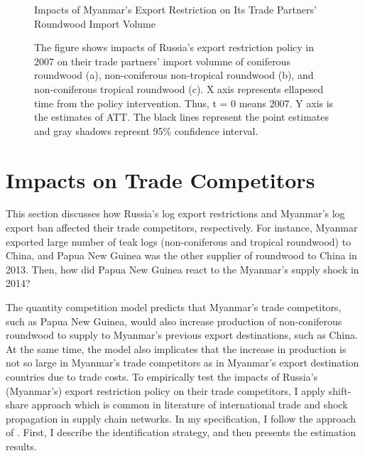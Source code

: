 \documentclass[a4paper,12pt]{article}
\begin{document}
\begin{figure}[H] 
    \centering
    \caption{Impacts of Myanmar's Export Restriction on Its Trade Partners' Roundwood Import Volume}
    \caption*{\small{The figure shows impacts of Russia's export restriction policy in 2007 on their trade partners' import volumne of coniferous roundwood (a), non-coniferous non-tropical roundwood (b), and non-coniferous tropical roundwood (c). X axis represents ellapesed time from the policy intervention. Thus, t = 0 means 2007. Y axis is the estimates of ATT. The black lines represent the point estimates and gray shadows represnt 95\% confidence interval.}}
    \label{fig:cf_imp_Myanmar}
\end{figure}

\section{Impacts on Trade Competitors}
This section discusses how Russia's log export restrictions and Myanmar's log export ban affected their trade competitors, respectively. For instance, Myanmar exported large number of teak logs (non-coniferous and tropical roundwood) to China, and Papua New Guinea was the other supplier of roundwood to China in 2013. Then, how did Papua New Guinea react to the Myanmar's supply shock in 2014? 

The quantity competition model predicts that Myanmar's trade competitors, such as Papua New Guinea, would also increase production of non-coniferous roundwood to supply to Myanmar's previous export destinations, such as China. At the same time, the model also implicates that the increase in production is not so large in Myanmar's trade competitors as in Myanmar's export destination countries due to trade costs. To empirically test the impacts of Russia's (Myanmar's) export restriction policy on their trade competitors, I apply shift-share approach which is common in literature of international trade and shock propagation in supply chain networks. In my specification, I follow the approach of \cite{huneeus2018production}. First, I describe the identification strategy, and then presents the estimation results.
\end{document}
